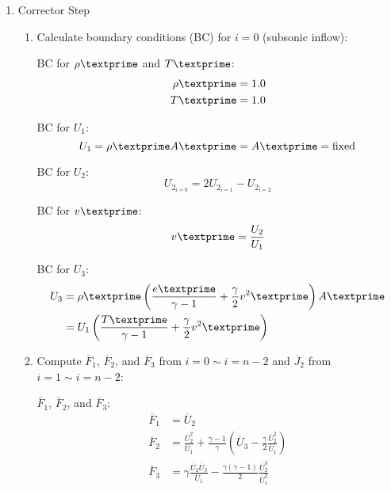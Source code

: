 \documentclass[12pt]{article}
\begin{document}
\begin{enumerate}
\begin{enumerate}
\begin{enumerate}
		\end{enumerate}
		\item Corrector Step
		\begin{enumerate}
			\item Calculate boundary conditions (BC) for $i = 0$ (subsonic inflow):
				\par BC for $\rho\textprime$ and $T\textprime$:
				\begin{align}
					\rho\textprime	&= 1.0 \\
					T\textprime	&= 1.0
				\end{align}
				\par BC for $U_{1}$:
				\begin{equation}
					U_{1} = \rho\textprime A\textprime = A\textprime = \text{fixed}
				\end{equation}
				\par BC for $U_{2}$:
				\begin{equation}
					U_{2_{i=0}} = 2U_{2_{i=1}} - U_{2_{i=2}}
				\end{equation}
				\par BC for $v\textprime$:
				\begin{equation}
					v\textprime = \frac{U_{2}}{U_{1}}
				\end{equation}
				\par BC for $U_{3}$:
				\begin{align}
					U_{3} 	&= \rho\textprime\left(\frac{e\textprime}{\gamma - 1} + \frac{\gamma}{2}v^{2}\textprime\right)A\textprime \\
						&= U_{1}\left(\frac{T\textprime}{\gamma - 1} + \frac{\gamma}{2}v^{2}\textprime\right)
				\end{align}
			\item Compute $\overline{F}_1$, $\overline{F}_2$, and $\overline{F}_3$ from $i = 0 \sim i = n - 2$ and $\overline{J}_2$ from $i = 1 \sim i = n - 2$:
				\par $\overline{F}_{1}$, $\overline{F}_{2}$, and $\overline{F}_{3}$:
				\begin{align}
					\overline{F}_{1}	&= \overline{U}_{2} \\
					\overline{F}_{2}	&= \frac{\overline{U}_{2}^{2}}{\overline{U}_{1}} + \frac{\gamma - 1}{\gamma}\left(\overline{U}_{3} - \frac{\gamma}{2}\frac{\overline{U}_{2}^{2}}{\overline{U}_{1}}\right) \\
					\overline{F}_{3}	&= \gamma\frac{\overline{U}_{2}\overline{U}_{3}}{\overline{U}_{1}} - \frac{\gamma\left(\gamma - 1\right)}{2}\frac{\overline{U}_{2}^{3}}{\overline{U}_{1}^{2}}

\end{align}
\end{enumerate}
\end{enumerate}
\end{enumerate}
\end{document}
